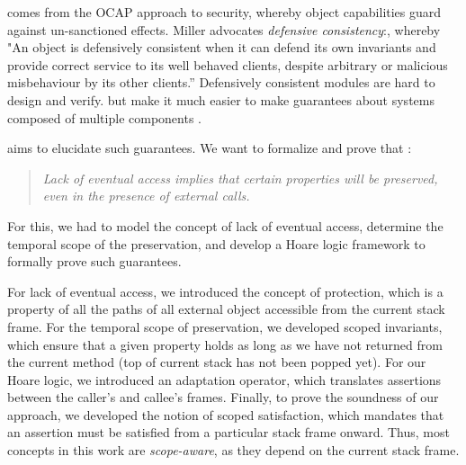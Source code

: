 
\newcommand{\paragraphSD}[1]{\vspace{.1cm}\noindent{\emph{#1}}}


\paragraphSD{Our motivation}
comes from the OCAP approach to security, whereby object capabilities guard against un-sanctioned effects.
Miller \cite{miller-esop2013,MillerPhD} advocates
 \emph{defensive consistency}:, whereby %
 {"An object is defensively
  consistent when it can defend its own invariants and provide correct
  service to its well behaved clients, despite arbitrary or malicious
  misbehaviour by its other clients.''}  Defensively consistent
modules  are  hard to design %
 and  verify. but
make it much
easier to make guarantees about systems composed of multiple components
\cite{Murray10dphil}.

 \paragraphSD{Our Work} aims to elucidate such guarantees. We want to formalize and prove  that 
\cite{permissionAuthority}:
\begin{quote}
\emph{Lack of eventual access implies that certain properties will be preserved, even in the presence of external calls.}
\end{quote}
For this, we had  to  model the concept of  lack of eventual access,  determine the temporal scope of the preservation, and  develop a Hoare logic framework to formally prove such guarantees.

For lack of eventual access,  we introduced the concept of protection, which is a property of all  the paths of all external object accessible from the current stack frame.
For the  temporal scope of preservation, we developed scoped invariants, which ensure that a given property holds as long as we have not returned from the current method (top of current stack has not been popped yet). 
 For our Hoare logic, we introduced an adaptation operator, which translates assertions between the caller’s and callee’s frames. 
 Finally, to prove the soundness of our approach, we developed the notion of scoped satisfaction,  which mandates that an assertion must be satisfied from a particular stack frame onward. 
 Thus, most concepts in this work are  \emph{scope-aware}, as they depend  on the current stack frame.
 
